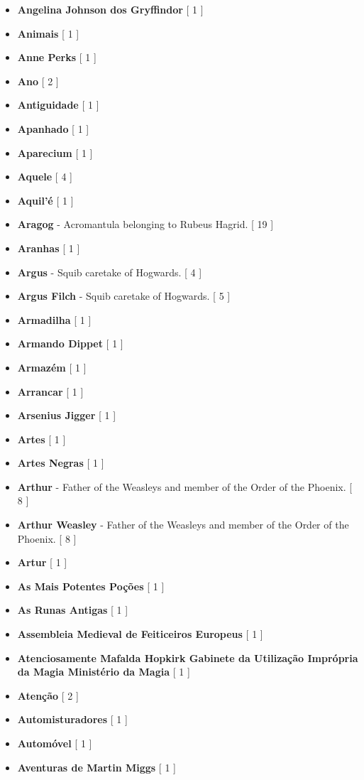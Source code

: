 \documentclass[a4paper]{article}
\begin{document}
\begin{itemize}
	\item \textbf{Angelina Johnson dos Gryffindor} [ 1 ]
	\item \textbf{Animais} [ 1 ]
	\item \textbf{Anne Perks} [ 1 ]
	\item \textbf{Ano} [ 2 ]
	\item \textbf{Antiguidade} [ 1 ]
	\item \textbf{Apanhado} [ 1 ]
	\item \textbf{Aparecium} [ 1 ]
	\item \textbf{Aquele} [ 4 ]
	\item \textbf{Aquil'é} [ 1 ]
	\item \textbf{Aragog} - Acromantula belonging to Rubeus Hagrid. [ 19 ]
	\item \textbf{Aranhas} [ 1 ]
	\item \textbf{Argus} - Squib caretake of Hogwards. [ 4 ]
	\item \textbf{Argus Filch} - Squib caretake of Hogwards. [ 5 ]
	\item \textbf{Armadilha} [ 1 ]
	\item \textbf{Armando Dippet} [ 1 ]
	\item \textbf{Armazém} [ 1 ]
	\item \textbf{Arrancar} [ 1 ]
	\item \textbf{Arsenius Jigger} [ 1 ]
	\item \textbf{Artes} [ 1 ]
	\item \textbf{Artes Negras} [ 1 ]
	\item \textbf{Arthur} - Father of the Weasleys and member of the Order of the Phoenix. [ 8 ]
	\item \textbf{Arthur Weasley} - Father of the Weasleys and member of the Order of the Phoenix. [ 8 ]
	\item \textbf{Artur} [ 1 ]
	\item \textbf{As Mais Potentes Poções} [ 1 ]
	\item \textbf{As Runas Antigas} [ 1 ]
	\item \textbf{Assembleia Medieval de Feiticeiros Europeus} [ 1 ]
	\item \textbf{Atenciosamente Mafalda Hopkirk Gabinete da Utilização Imprópria da Magia Ministério da Magia} [ 1 ]
	\item \textbf{Atenção} [ 2 ]
	\item \textbf{Automisturadores} [ 1 ]
	\item \textbf{Automóvel} [ 1 ]
	\item \textbf{Aventuras de Martin Miggs} [ 1 ]

\end{itemize}
\end{document}
